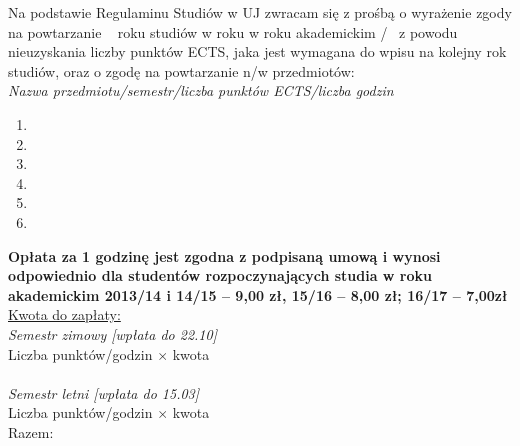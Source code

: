 \documentclass{wmiisubmission}
\begin{document}
\cracowdate
{}
\studentaddress
\addressee[-3em]{\piotrniemiec}

\vskip 0.5cm

Na podstawie Regulaminu Studiów w UJ zwracam się z prośbą o wyrażenie zgody na
powtarzanie \fillField{2cm}~ roku studiów w roku
w roku akademickim \fillField{1cm}/\fillField{1cm}~ z powodu nieuzyskania liczby
punktów ECTS, jaka jest wymagana do wpisu na kolejny
rok studiów, oraz o zgodę na powtarzanie n/w przedmiotów:\\

\textit{Nazwa przedmiotu/semestr/liczba punktów ECTS/liczba godzin}
\begin{enumerate}
    \item \dotfill
    \item \dotfill
    \item \dotfill
    \item \dotfill
    \item \dotfill
    \item \dotfill
\end{enumerate}
{\footnotesize \bf Opłata za 1 godzinę jest zgodna z podpisaną umową i wynosi odpowiednio dla studentów rozpoczynających studia w roku akademickim 2013/14 i 14/15 – 9,00 zł, 15/16 – 8,00 zł; 16/17 – 7,00zł}\\

\noindent
\underline{Kwota do zapłaty:}\\
\textit{Semestr zimowy [wpłata do 22.10]}\\
Liczba punktów/godzin \dotfill $\times$ kwota \dotfill \\\\
\textit{Semestr letni [wpłata do 15.03]}\\
Liczba punktów/godzin \dotfill $\times$ kwota \dotfill \\

\hspace{\fill} Razem: \fillField{6cm} \hspace{2.0cm}

\vskip 0.6cm
\studentsignature
\vskip 1.0cm

\end{document}
